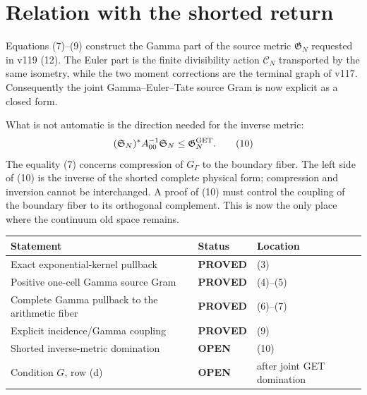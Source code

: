 \documentclass[11pt]{article}
\newcommand{\PROVED}{\textcolor{green!40!black}{\textbf{PROVED}}}
\newcommand{\OPEN}{\textcolor{red!70!black}{\textbf{OPEN}}}
\begin{document}
\section{Relation with the shorted return}

Equations (7)--(9) construct the Gamma part of the source metric
$\mathfrak G_N$ requested in v119 (12).  The Euler part is the finite
divisibility action $\mathcal C_N$ transported by the same isometry, while
the two moment corrections are the terminal graph of v117.  Consequently
the joint Gamma--Euler--Tate source Gram is now explicit as a closed form.

What is not automatic is the direction needed for the inverse metric:
\begin{equation}
 (\mathfrak S_N)^*A_{00}^{-1}\mathfrak S_N
 \le \mathfrak G_N^{\rm GET}.                               \tag{10}
\end{equation}
The equality (7) concerns compression of $G_\Gamma$ to the boundary fiber.
The left side of (10) is the inverse of the shorted complete physical form;
compression and inversion cannot be interchanged.  A proof of (10) must
control the coupling of the boundary fiber to its orthogonal complement.
This is now the only place where the continuum old space remains.

\begin{center}
\begin{tabular}{>{\raggedright\arraybackslash}p{.55\linewidth}
                >{\centering\arraybackslash}p{.15\linewidth}
                >{\raggedright\arraybackslash}p{.20\linewidth}}
\toprule
Statement & Status & Location \\
\midrule
Exact exponential-kernel pullback & \PROVED & (3) \\
Positive one-cell Gamma source Gram & \PROVED & (4)--(5) \\
Complete Gamma pullback to the arithmetic fiber & \PROVED & (6)--(7) \\
Explicit incidence/Gamma coupling & \PROVED & (9) \\
Shorted inverse-metric domination & \OPEN & (10) \\
Condition $G$, row (d) & \OPEN & after joint GET domination \\
\bottomrule
\end{tabular}
\end{center}
\end{document}
